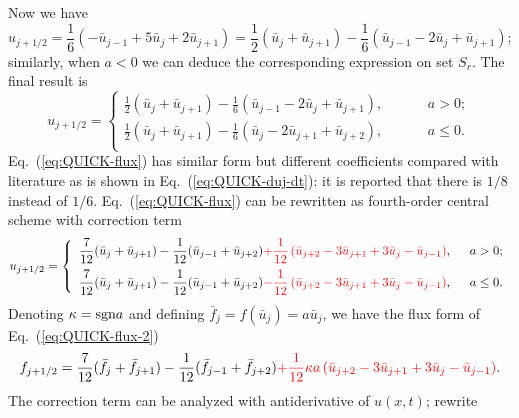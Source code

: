 \documentclass[]{article}
\def\sgn{\hbox{\rm sgn}}
\begin{document}
Now we have
\[u_{j+1/2}=\frac{1}{6}(-\bar u_{j-1}+5\bar u_j+2\bar u_{j+1})=\frac{1}{2}(\bar
u_j+\bar u_{j+1})-\frac{1}{6}(\bar u_{j-1}-2\bar u_j+\bar u_{j+1});\]
similarly, when $a<0$ we can deduce the corresponding expression on set
$S_r$. The final result is
\begin{equation}
u_{j+1/2}=\left\{\begin{array}{ll}
\displaystyle
\frac{1}{2}(\bar u_j+\bar u_{j+1})-\frac{1}{6}(\bar u_{j-1}-2\bar u_j+\bar u_{j+1}),\hspace{1cm} & a>0;\\[3mm]
\displaystyle
\frac{1}{2}(\bar u_j+\bar u_{j+1})-\frac{1}{6}(\bar u_j-2\bar
u_{j+1}+\bar u_{j+2}),\hspace{1cm} & a\leq 0.\\
\end{array}\right.
\label{eq:QUICK-flux}
\end{equation}
Eq.~(\ref{eq:QUICK-flux}) has similar form but different coefficients compared
with literature \cite{leonard1979stable} as is shown in
Eq.~(\ref{eq:QUICK-duj-dt}): it is reported that there is $1/8$
instead of $1/6$.
Eq.~(\ref{eq:QUICK-flux}) can be rewritten as fourth-order central scheme with
correction term
\begin{equation}
u_{j+1/2}=\left\{\begin{array}{ll}
\displaystyle
\frac{7}{12}(\bar u_j+\bar u_{j+1})-\frac{1}{12}(\bar u_{j-1}+\bar u_{j+2}){\color{red}+\frac{1}{12}\left(\bar u_{j+2}-3\bar u_{j+1}+3\bar u_{j}-\bar u_{j-1} \right)}     ,\hspace{2mm} & a>0;\\[3mm]
\displaystyle
\frac{7}{12}(\bar u_j+\bar u_{j+1})-\frac{1}{12}(\bar u_{j-1}+\bar
u_{j+2}){\color{red}-\frac{1}{12}\left(\bar u_{j+2}-3\bar u_{j+1}+3\bar
u_{j}-\bar u_{j-1} \right)}     ,\hspace{2mm} & a\leq 0.\\
\end{array}
\right.
\label{eq:QUICK-flux-2}
\end{equation}
Denoting $\kappa = \sgn a$ and defining $\bar f_j = f(\bar u_j) = a\bar u_j$, we
have the flux form of Eq.~(\ref{eq:QUICK-flux-2})
\begin{equation}
f_{j+1/2}=
\frac{7}{12}(\bar f_j+\bar f_{j+1})-\frac{1}{12}(\bar f_{j-1}+\bar
f_{j+2}){\color{red}+\frac{1}{12}\kappa a\left(\bar u_{j+2}-3\bar u_{j+1}+3\bar
u_{j}-\bar u_{j-1} \right)}.
\label{eq:QUICK-flux-3}
\end{equation}
The correction term can be analyzed with antiderivative of $u(x,t)$; rewrite
\end{document}
